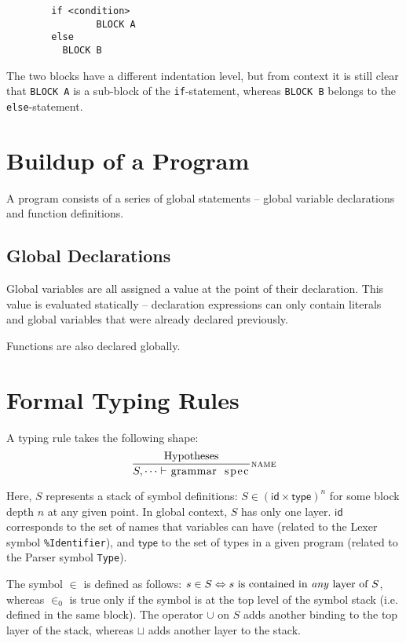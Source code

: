 \documentclass{article}
\newcommand{\code}[1]{\lstinline[columns=fixed]{#1}}
\newcommand{\drmrule}[5]{\frac{#1}{#2\vdash_{\mathsf{#3}}#4}\textsc{\small{#5}}}
\begin{document}
		\begin{lstlisting}
		if <condition>
				BLOCK A
		else
		  BLOCK B
		\end{lstlisting}
		
		The two blocks have a different indentation level, but from context it is still clear that \code{BLOCK A} is a sub-block of the \code{if}-statement, whereas \code{BLOCK B} belongs to the \code{else}-statement.
		
	\section{Buildup of a Program}
	
		A program consists of a series of global statements -- global variable declarations and function definitions.
		
		\subsection{Global Declarations}
		
			Global variables are all assigned a value at the point of their declaration. This value is evaluated statically -- declaration expressions can only contain literals and global variables that were already declared previously.
			
			Functions are also declared globally.
		
	\section{Formal Typing Rules}
	
		A typing rule takes the following shape: $$ \drmrule{\mathrm{Hypotheses}}{S,\dots}{}{\textnormal{\code{grammar spec}}}{name} $$
		
		Here, $S$ represents a stack of symbol definitions: $S \in (\mathsf{id} \times \mathsf{type})^n$ for some block depth $n$ at any given point. In global context, $S$ has only one layer. $\mathsf{id}$ corresponds to the set of names that variables can have (related to the Lexer symbol \texttt{\%Identifier}), and $\mathsf{type}$ to the set of types in a given program (related to the Parser symbol \texttt{Type}).
		
		The symbol $\in$ is defined as follows: $s\in S \Leftrightarrow \textnormal{$s$ is contained in \textit{any} layer of $S$}$, whereas $\in_0$ is true only if the symbol is at the top level of the symbol stack (i.e. defined in the same block). The operator $\cup$ on $S$ adds another binding to the top layer of the stack, whereas $\sqcup$ adds another layer to the stack.
		
\end{document}
